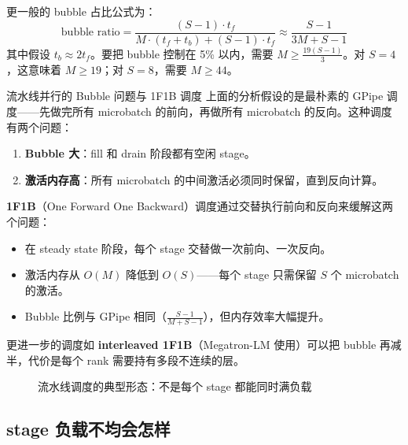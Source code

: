 \documentclass[a4paper]{article}
\begin{document}
更一般的 bubble 占比公式为：
$$
\text{bubble ratio} = \frac{(S - 1) \cdot t_f}{M \cdot (t_f + t_b) + (S-1) \cdot t_f} \approx \frac{S-1}{3M + S - 1}
$$
其中假设 $t_b \approx 2t_f$。要把 bubble 控制在 5\% 以内，需要 $M \geq \frac{19(S-1)}{3}$。对 $S=4$，这意味着 $M \geq 19$；对 $S=8$，需要 $M \geq 44$。

\begin{warningbox}{流水线并行的 Bubble 问题与 1F1B 调度}
上面的分析假设的是最朴素的 GPipe 调度——先做完所有 microbatch 的前向，再做所有 microbatch 的反向。这种调度有两个问题：
\begin{enumerate}
    \item \textbf{Bubble 大}：fill 和 drain 阶段都有空闲 stage。
    \item \textbf{激活内存高}：所有 microbatch 的中间激活必须同时保留，直到反向计算。
\end{enumerate}

\textbf{1F1B}（One Forward One Backward）调度通过交替执行前向和反向来缓解这两个问题：
\begin{itemize}
    \item 在 steady state 阶段，每个 stage 交替做一次前向、一次反向。
    \item 激活内存从 $O(M)$ 降低到 $O(S)$——每个 stage 只需保留 $S$ 个 microbatch 的激活。
    \item Bubble 比例与 GPipe 相同（$\frac{S-1}{M+S-1}$），但内存效率大幅提升。
\end{itemize}
更进一步的调度如 \textbf{interleaved 1F1B}（Megatron-LM 使用）可以把 bubble 再减半，代价是每个 rank 需要持有多段不连续的层。
\end{warningbox}

\begin{figure}[H]
\centering
{}
\caption{流水线调度的典型形态：不是每个 stage 都能同时满负载}
\end{figure}

\subsection{stage 负载不均会怎样}
\end{document}
